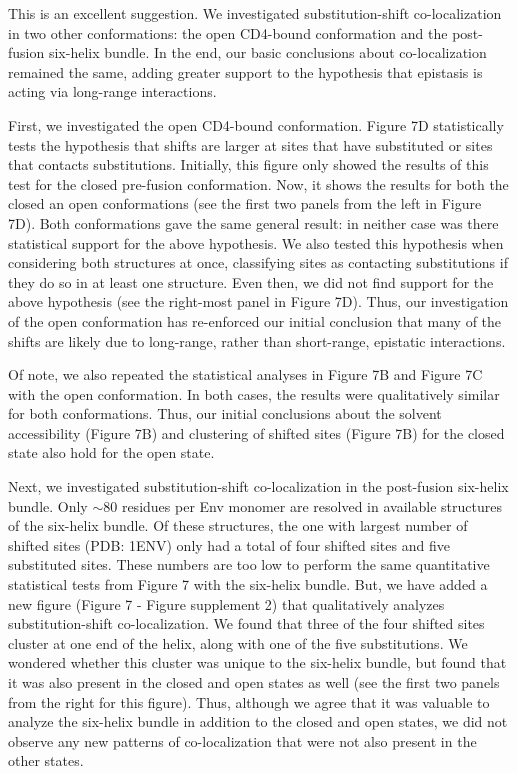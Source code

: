 \documentclass[11pt, oneside]{article}   	%
\begin{document}
{\color{black}
This is an excellent suggestion.
We investigated substitution-shift co-localization in two other conformations: the open CD4-bound conformation and the post-fusion six-helix bundle.
In the end, our basic conclusions about co-localization remained the same, adding greater support to the hypothesis that epistasis is acting via long-range interactions.

First, we investigated the open CD4-bound conformation.
Figure 7D statistically tests the hypothesis that shifts are larger at sites that have substituted or sites that contacts substitutions.
Initially, this figure only showed the results of this test for the closed pre-fusion conformation.
Now, it shows the results for both the closed an open conformations (see the first two panels from the left in Figure 7D).
Both conformations gave the same general result: in neither case was there statistical support for the above hypothesis.
We also tested this hypothesis when considering both structures at once, classifying sites as contacting substitutions if they do so in at least one structure.
Even then, we did not find support for the above hypothesis (see the right-most panel in Figure 7D).
Thus, our investigation of the open conformation has re-enforced our initial conclusion that many of the shifts are likely due to long-range, rather than short-range, epistatic interactions.

Of note, we also repeated the statistical analyses in Figure 7B and Figure 7C with the open conformation.
In both cases, the results were qualitatively similar for both conformations.
Thus, our initial conclusions about the solvent accessibility (Figure 7B) and clustering of shifted sites (Figure 7B) for the closed state also hold for the open state.

Next, we investigated substitution-shift co-localization in the post-fusion six-helix bundle.
Only $\sim$80 residues per Env monomer are resolved in available structures of the six-helix bundle.
Of these structures, the one with largest number of shifted sites (PDB: 1ENV) only had a total of four shifted sites and five substituted sites.
These numbers are too low to perform the same quantitative statistical tests from Figure 7 with the six-helix bundle.
But, we have added a new figure (Figure 7 - Figure supplement 2) that qualitatively analyzes substitution-shift co-localization.
We found that three of the four shifted sites cluster at one end of the helix, along with one of the five substitutions.
We wondered whether this cluster was unique to the six-helix bundle, but found that it was also present in the closed and open states as well (see the first two panels from the right for this figure).
Thus, although we agree that it was valuable to analyze the six-helix bundle in addition to the closed and open states, we did not observe any new patterns of co-localization that were not also present in the other states.

}
\end{document}
